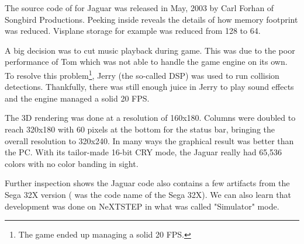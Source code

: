 \vspace{-12pt}
The source code of \doom{} for Jaguar was released in May, 2003 by Carl Forhan of Songbird Productions. Peeking inside reveals the details of how memory footprint was reduced. Visplane storage for example was reduced from 128 to 64.\\
\par
{}
\par
A big decision was to cut music playback during game. This was due to the poor performance of Tom which was not able to handle the game engine on its own. To resolve this problem\footnote{The game ended up managing a solid 20 FPS.}, Jerry (the so-called DSP) was used to run collision detections. Thankfully, there was still enough juice in Jerry to play sound effects and the engine managed a solid 20 FPS.\\
\par
The 3D rendering was done at a resolution of 160x180. Columns were doubled to reach 320x180 with 60 pixels at the bottom for the status bar, bringing the overall resolution to 320x240. In many ways the graphical result was better than the PC. With its tailor-made 16-bit CRY mode, the Jaguar really had 65,536 colors with no color banding in sight.




\par
Further inspection shows the Jaguar code also contains a few artifacts from the Sega 32X version ( was the code name of the Sega 32X). We can also learn that development was done on NeXTSTEP in what was called "Simulator" mode.\\
\par
{}
\par

